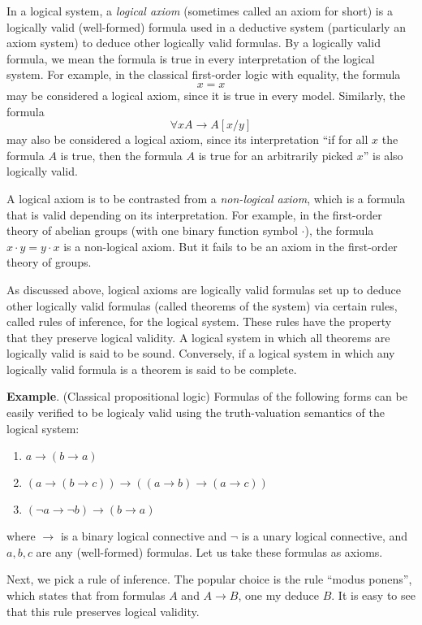 \documentclass[12pt]{article}
\begin{document}
In a logical system, a \emph{logical axiom} (sometimes called an axiom for short) is a logically valid (well-formed) formula used in a deductive system (particularly an axiom system) to deduce other logically valid formulas.  By a logically valid formula, we mean the formula is true in every interpretation of the logical system.  For example, in the classical first-order logic with equality, the formula $$x=x$$ may be considered a logical axiom, since it is true in every model.  Similarly, the formula $$\forall x A \to A[x/y]$$ may also be considered a logical axiom, since its interpretation ``if for all $x$ the formula $A$ is true, then the formula $A$ is true for an arbitrarily picked $x$'' is also logically valid.

A logical axiom is to be contrasted from a \emph{non-logical axiom}, which is a formula that is valid depending on its interpretation.  For example, in the first-order theory of abelian groups (with one binary function symbol $\cdot$), the formula $x\cdot y=y\cdot x$ is a non-logical axiom.  But it fails to be an axiom in the first-order theory of groups.

As discussed above, logical axioms are logically valid formulas set up to deduce other logically valid formulas (called theorems of the system) via certain rules, called rules of inference, for the logical system.  These rules have the property that they preserve logical validity.  A logical system in which all theorems are logically valid is said to be sound.  Conversely, if a logical system in which any logically valid formula is a theorem is said to be complete.

\textbf{Example}.  (Classical propositional logic)  Formulas of the following forms can be easily verified to be logicaly valid using the truth-valuation semantics of the logical system:
\begin{enumerate}
\item $a\to (b\to a)$
\item $(a\to(b\to c))\to ((a\to b)\to(a\to c))$
\item $(\neg a\to \neg b)\to(b\to a)$
\end{enumerate}
where $\to$ is a binary logical connective and $\neg$ is a unary logical connective, and $a,b,c$ are any (well-formed) formulas.  Let us take these formulas as axioms.  

Next, we pick a rule of inference.  The popular choice is the rule ``modus ponens'', which states that from formulas $A$ and $A\to B$, one my deduce $B$.  It is easy to see that this rule preserves logical validity.
\end{document}
